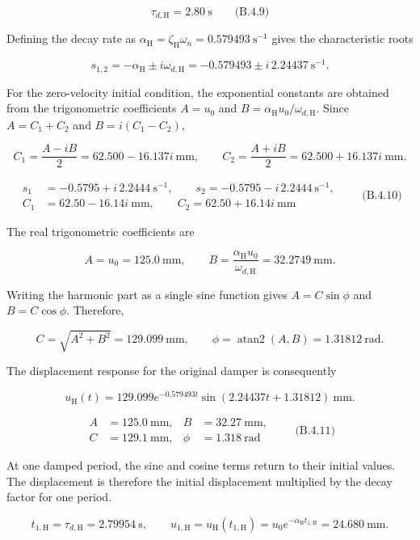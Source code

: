 \[
\boxed{\tau_{d,\mathrm{H}}=2.80\ \mathrm{s}}
\qquad\text{(B.4.9)}
\]

Defining the decay rate as $\alpha_{\mathrm{H}}=\zeta_{\mathrm{H}}\omega_n=0.579493\ \mathrm{s^{-1}}$ gives the characteristic roots

\[
s_{1,2}=-\alpha_{\mathrm{H}}\pm i\omega_{d,\mathrm{H}}
 =-0.579493\pm i\,2.24437\ \mathrm{s^{-1}}.
\]

For the zero-velocity initial condition, the exponential constants are obtained from the trigonometric coefficients $A=u_0$ and $B=\alpha_{\mathrm{H}}u_0/\omega_{d,\mathrm{H}}$. Since $A=C_1+C_2$ and $B=i(C_1-C_2)$,

\[
C_1=\frac{A-iB}{2}=62.500-16.137i\ \mathrm{mm},
\qquad
C_2=\frac{A+iB}{2}=62.500+16.137i\ \mathrm{mm}.
\]

\[
\boxed{
\begin{aligned}
s_1&=-0.5795+i\,2.2444\ \mathrm{s^{-1}},\qquad
s_2=-0.5795-i\,2.2444\ \mathrm{s^{-1}},\\
C_1&=62.50-16.14i\ \mathrm{mm},\qquad
C_2=62.50+16.14i\ \mathrm{mm}
\end{aligned}}
\qquad\text{(B.4.10)}
\]

The real trigonometric coefficients are

\[
A=u_0=125.0\ \mathrm{mm},
\qquad
B=\frac{\alpha_{\mathrm{H}}u_0}{\omega_{d,\mathrm{H}}}=32.2749\ \mathrm{mm}.
\]

Writing the harmonic part as a single sine function gives $A=C\sin\phi$ and $B=C\cos\phi$. Therefore,

\[
C=\sqrt{A^2+B^2}=129.099\ \mathrm{mm},
\qquad
\phi=\operatorname{atan2}(A,B)=1.31812\ \mathrm{rad}.
\]

The displacement response for the original damper is consequently

\[
u_{\mathrm{H}}(t)=129.099e^{-0.579493t}\sin(2.24437t+1.31812)\ \mathrm{mm}.
\]

\[
\boxed{
\begin{aligned}
A&=125.0\ \mathrm{mm},& B&=32.27\ \mathrm{mm},\\
C&=129.1\ \mathrm{mm},& \phi&=1.318\ \mathrm{rad}
\end{aligned}}
\qquad\text{(B.4.11)}
\]

At one damped period, the sine and cosine terms return to their initial values. The displacement is therefore the initial displacement multiplied by the decay factor for one period.

\[
t_{1,\mathrm{H}}=\tau_{d,\mathrm{H}}=2.79954\ \mathrm{s},
\qquad
u_{1,\mathrm{H}}=u_{\mathrm{H}}(t_{1,\mathrm{H}})
 =u_0e^{-\alpha_{\mathrm{H}}t_{1,\mathrm{H}}}=24.680\ \mathrm{mm}.
\]

